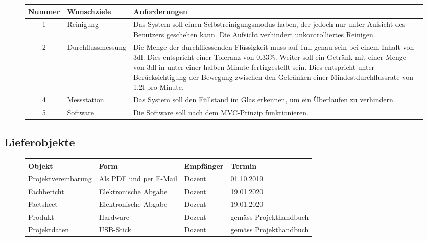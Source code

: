 \begin{figure}[H]
	\begin{flushleft}
		\small
		\begin{tabular}{|p{3cm}|p{3.25cm}|p{9.85cm}|}%
			\hline
			\multicolumn{1}{|l|}{\textbf{Nummer}} & \textbf{Wunschziele}  & \textbf{Anforderungen}                                                                                                                                            \\ \hline
		
			\multicolumn{1}{|c|}{1} & Reinigung & Das System soll einen Selbstreinigungsmodus haben, der jedoch nur unter Aufsicht des Benutzers geschehen kann. Die Aufsicht verhindert unkontrolliertes Reinigen. \\ \hline
			\multicolumn{1}{|c|}{2} & Durchflussmessung & Die Menge der durchfliessenden Flüssigkeit muss auf 1ml genau sein bei einem Inhalt von 3dl. Dies entspricht einer Toleranz von 0.33\%. Weiter soll ein Getränk mit einer Menge von 3dl in unter einer halben Minute fertiggestellt sein. Dies entspricht unter Berücksichtigung der Bewegung zwischen den Getränken einer Mindestdurchflussrate von 1.2l pro Minute. \\ \hline
			\multicolumn{1}{|c|}{4} & Messstation & Das System soll den Füllstand im Glas erkennen, um ein Überlaufen zu verhindern.\\ 
			\hline
			\multicolumn{1}{|c|}{5} & Software & Die Software soll nach dem MVC-Prinzip funktionieren. \\ 
			\hline
		\end{tabular}
	\end{flushleft}

	\label{table:Wunschziele}
\end{figure}
\subsection{Lieferobjekte}\label{subsec:Lieferobjekte}
\begin{figure}[H]
	\begin{flushleft}
		\small
		\begin{tabular}{|p{4.25cm}|p{3.75cm}|p{2.5cm}|p{3.75cm}|}%
			\hline

			\textbf{Objekt} & \textbf{Form} & \textbf{Empfänger} & \textbf{Termin} \\ \hline
			Projektvereinbarung & Als PDF und per E-Mail & Dozent & 01.10.2019 \\ \hline
			Fachbericht & Elektronische Abgabe & Dozent & 19.01.2020 \\ \hline
			Factsheet & Elektronische Abgabe & Dozent & 19.01.2020 \\ \hline
			Produkt & Hardware & Dozent & gemäss \newline Projekthandbuch \\ \hline
			Projektdaten & USB-Stick & Dozent & gemäss \newline Projekthandbuch \\ \hline
		
		\end{tabular}
	\end{flushleft}
	\label{table:Lieferobjekte}
\end{figure}